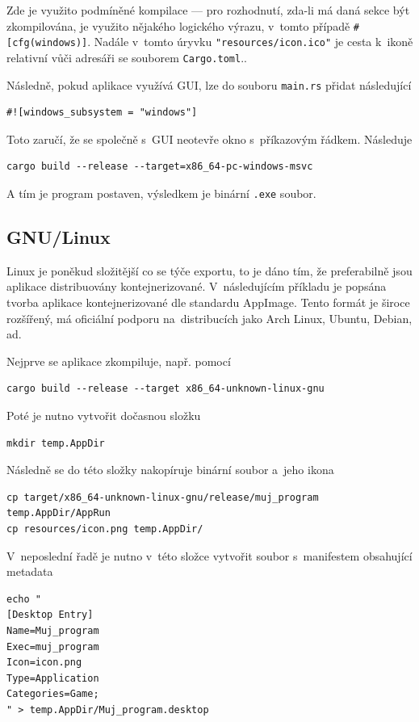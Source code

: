 \documentclass[a4paper, 12pt, twoside]{article} %
\newcommand{\rust}[1]{\texttt{#1}}
\begin{document}
		Zde je využito podmíněné kompilace — pro rozhodnutí, zda-li má daná sekce být zkompilována, je využito nějakého logického výrazu, v~tomto případě \texttt{#[cfg(windows)]}. Nadále v~tomto úryvku \rust{"resources/icon.ico"} je cesta k~ikoně relativní vůči adresáři se souborem \texttt{Cargo.toml}.\cite{comp_win_ico}.
		
		Následně, pokud aplikace využívá GUI, lze do souboru \texttt{main.rs} přidat následující
		\begin{verbatim}
#![windows_subsystem = "windows"]
		\end{verbatim}
		
		Toto zaručí, že se společně s~GUI neotevře okno s~příkazovým řádkem. Následuje
		\begin{verbatim}
cargo build --release --target=x86_64-pc-windows-msvc
		\end{verbatim}
		
		A tím je program postaven, výsledkem je binární \texttt{.exe} soubor.\cite{winexport}


	\subsection{GNU/Linux}
		Linux je poněkud složitější co se týče exportu, to je dáno tím, že preferabilně jsou aplikace distribuovány kontejnerizované. V~následujícím příkladu je popsána tvorba aplikace kontejnerizované dle standardu AppImage. Tento formát je široce rozšířený, má oficiální podporu na~distribucích jako Arch Linux, Ubuntu, Debian, ad.\cite{appimage}

		Nejprve se aplikace zkompiluje, např. pomocí
		\begin{verbatim}
cargo build --release --target x86_64-unknown-linux-gnu
		\end{verbatim}

		Poté je nutno vytvořit dočasnou složku
		\begin{verbatim}
mkdir temp.AppDir
		\end{verbatim}
		
		Následně se do této složky nakopíruje binární soubor a~jeho ikona
		\begin{verbatim}
cp target/x86_64-unknown-linux-gnu/release/muj_program temp.AppDir/AppRun
cp resources/icon.png temp.AppDir/
		\end{verbatim}
		
		V~neposlední řadě je nutno v~této složce vytvořit soubor s~manifestem obsahující metadata
		\begin{verbatim}
echo "
[Desktop Entry]
Name=Muj_program
Exec=muj_program
Icon=icon.png
Type=Application
Categories=Game;
" > temp.AppDir/Muj_program.desktop
		\end{verbatim}
\end{document}

